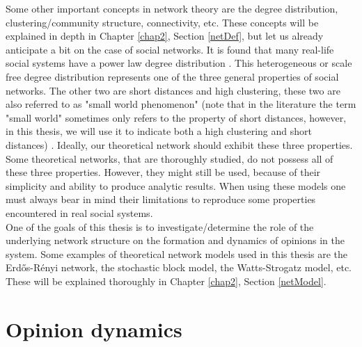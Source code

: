 \documentclass[11 pt , letterpaper , twoside , openright]{book}
\begin{document}
Some other important concepts in network theory are the degree distribution, clustering/community structure, connectivity, etc. These concepts will be explained in depth in Chapter \ref{chap2}, Section \ref{netDef}, but let us already anticipate a bit on the case of social networks. It is found that many real-life social systems have a power law degree distribution \cite{Muchnik2013}. This heterogeneous or scale free degree distribution represents one of the three general properties of social networks. The other two are short distances and high clustering, these two are also referred to as "small world phenomenon" (note that in the literature the term "small world" sometimes only refers to the property of short distances, however, in this thesis, we will use it to indicate both a high clustering and short distances) \cite{Muchnik2013}. Ideally, our theoretical network should exhibit these three properties. Some theoretical networks, that are thoroughly studied, do not possess all of these three properties. However, they might still be used, because of their simplicity and ability to produce analytic results. When using these models one must always bear in mind their limitations to reproduce some properties encountered in real social systems. \\
\newline
One of the goals of this thesis is to investigate/determine the role of the underlying network structure on the formation and dynamics of opinions in the system. Some examples of theoretical network models used in this thesis are the Erd\H{o}s-R\'{e}nyi network, the stochastic block model, the Watts-Strogatz model, etc. These will be explained thoroughly in Chapter \ref{chap2}, Section \ref{netModel}. %



\section{Opinion dynamics}
\end{document}
